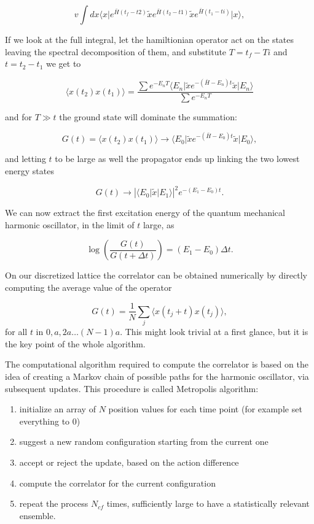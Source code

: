 \documentclass[%
oneside,                 %
final,                   %
10pt]{article}
\begin{document}
\[	
v	\int dx \langle x\vert  e^{\bar{H}(t_f-t2)} \tilde{x} e^{\bar{H}(t_2-t1)} \tilde{x} e^{\bar{H}(t_1-ti)} \vert x\rangle,
\]

If we look at the full integral, let the hamiltionian operator act on
the states leaving the spectral decomposition of them, and substitute
$T = t_f-Ti$ and $t = t_2 - t_1$ we get to

\[
	\langle x(t_2)x(t_1) \rangle = \frac{\sum e^{-E_n T} \langle E_n\vert \tilde{x} e^{-(\bar{H}-E_n)t}  \tilde{x}\vert E_n\rangle }{\sum e^{-E_n T }}
\]

and for $T \gg t$ the ground state will dominate the summation:

\[
	G(t) = \langle x(t_2)x(t_1)\rangle \rightarrow  \langle E_0\vert \tilde{x} e^{-(\bar{H}-E_0)t}  \tilde{x}\vert E_0\rangle,
\]

and letting $t$ to be large as well the propagator ends up linking the two lowest energy states

\[
	G(t) \rightarrow  |\langle E_0\vert \tilde{x} \vert E_1\rangle|^2e^{-(E_1-E_0)t}.
\]

We can now extract the first excitation energy of the quantum mechanical harmonic oscillator, in the limit of $t$ large, as

\[
	\log\left( \frac{G(t)}{G(t+\Delta t)}\right) = (E_1 - E_0)\Delta t.
\]

On our discretized lattice the correlator can be obtained numerically by directly computing the average value of the operator

\[
	G(t) = \frac{1}{N}\sum_j\langle x(t_j+t)x(t_j)\rangle,
\]
for all $t$ in $0, a, 2a\dots (N-1)a$. This might look trivial at a first glance, but it is the key point of the whole algorithm.

The computational algorithm required to compute the correlator is
based on the idea of creating a Markov chain of possible paths for the
harmonic oscillator, via subsequent updates. This procedure is called
Metropolis algorithm:

\begin{enumerate}
\item initialize an array of $N$ position values for each time point (for example set everything to 0)

\item suggest a new random configuration starting from the current one

\item accept or reject the update, based on the action difference

\item compute the correlator for the current configuration

\item repeat the process $N_{cf}$ times, sufficiently large to have a statistically relevant ensemble.
\end{enumerate}
\end{document}
